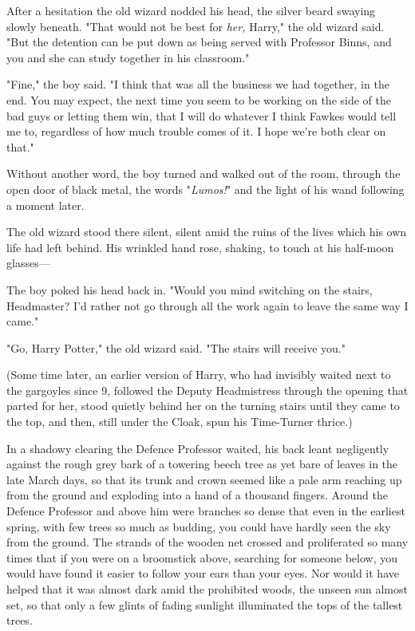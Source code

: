 After a hesitation the old wizard nodded his head, the silver beard swaying
slowly beneath. "That would not be best for \emph{her,} Harry," the old wizard
said. "But the detention can be put down as being served with Professor Binns,
and you and she can study together in his classroom."

"Fine," the boy said. "I think that was all the business we had together, in
the end. You may expect, the next time you seem to be working on the side of
the bad guys or letting them win, that I will do whatever I think Fawkes would
tell me to, regardless of how much trouble comes of it. I hope we're both clear
on that."

Without another word, the boy turned and walked out of the room, through the
open door of black metal, the words "\emph{Lumos!}" and the light of his wand
following a moment later.

The old wizard stood there silent, silent amid the ruins of the lives which his
own life had left behind. His wrinkled hand rose, shaking, to touch at his
half-moon glasses---

The boy poked his head back in. "Would you mind switching on the stairs,
Headmaster? I'd rather not go through all the work again to leave the same way
I came."

"Go, Harry Potter," the old wizard said. "The stairs will receive you."

(Some time later, an earlier version of Harry, who had invisibly waited next to
the gargoyles since 9\PM, followed the Deputy Headmistress through the opening
that parted for her, stood quietly behind her on the turning stairs until they
came to the top, and then, still under the Cloak, spun his Time-Turner thrice.)

In a shadowy clearing the Defence Professor waited, his back leant negligently
against the rough grey bark of a towering beech tree as yet bare of leaves in the
late March days, so that its trunk and crown seemed like a pale arm reaching up
from the ground and exploding into a hand of a thousand fingers. Around the
Defence Professor and above him were branches so dense that even in the
earliest spring, with few trees so much as budding, you could have hardly seen
the sky from the ground. The strands of the wooden net crossed and proliferated
so many times that if you were on a broomstick above, searching for someone
below, you would have found it easier to follow your ears than your eyes. Nor
would it have helped that it was almost dark amid the prohibited woods, the
unseen sun almost set, so that only a few glints of fading sunlight illuminated
the tops of the tallest trees.

